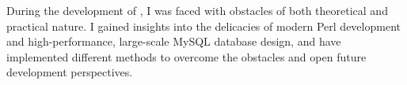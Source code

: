 During the development of \pname, I was faced with obstacles of both theoretical
and practical nature. I gained insights into the delicacies of modern Perl
development and high-performance, large-scale MySQL database design, and have
implemented different methods to overcome the obstacles and open future
development perspectives.
